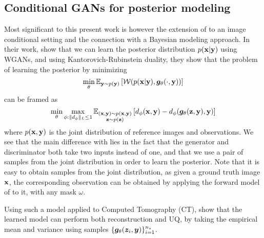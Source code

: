 \subsection{Conditional GANs for posterior modeling}\label{ss:gan_posterior_modeling}
Most significant to this present work is however the extension of  to an image conditional setting and the connection with a Bayesian modeling approach. In their work, \citet{adler2018deep} show that we can learn the posterior distribution $p({\mathbf{x}}|{\mathbf{y}})$ using WGANs, and using Kantorovich-Rubinstein duality, they show that the problem of learning the posterior by minimizing
$$\min_\theta \mathbb{E}_{{\mathbf{y}} \sim p({\mathbf{y}})}\left[\mathcal{W}(p({\mathbf{x}}|{\mathbf{y}}),{\bm{g}}_\theta(\cdot,{\mathbf{y}}))\right]$$ 
can be framed as
\begin{equation}
     \min_\theta \max_{\phi:\|d_\phi\|_L\leq 1} \mathbb{E}_{\substack{({\mathbf{x}},{\mathbf{y}}) \sim p({\mathbf{x}},{\mathbf{y}}) \\ {\mathbf{z}} \sim p({\mathbf{z}})}} \left[ d_\phi({\mathbf{x}},{\mathbf{y}})  - d_\phi({\bm{g}}_\theta({\mathbf{z}},{\mathbf{y}}),{\mathbf{y}})\right]\label{eq:wgan_objective}
\end{equation}
where $p({\mathbf{x}},{\mathbf{y}})$ is the joint distribution of reference images and observations. We see that the main difference with  lies in the fact that the generator and discriminator both take two inputs instead of one, and that we use a pair of samples from the joint distribution in order to learn the posterior. Note that it is easy to obtain samples from the joint distribution, as given a ground truth image ${\mathbf{x}}$, the corresponding observation can be obtained by applying the forward model of  to it, with any mask $\omega$. 

Using such a model applied to Computed Tomography (CT), \citet{adler2018deep} show that the learned model can perform both reconstruction and UQ, by taking the empirical mean and variance using samples $\{{\bm{g}}_\theta({\bm{z}}_i,{\bm{y}})\}_{i=1}^{n_s}$. 


